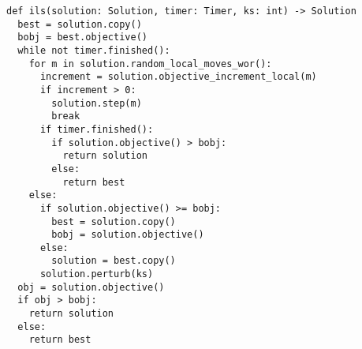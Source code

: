 
\begin{lstlisting}[float=h,caption={Iterated Local Search Solver},label=lst:ils]
def ils(solution: Solution, timer: Timer, ks: int) -> Solution
  best = solution.copy()
  bobj = best.objective()
  while not timer.finished():
    for m in solution.random_local_moves_wor():
      increment = solution.objective_increment_local(m)
      if increment > 0:
        solution.step(m)
        break
      if timer.finished():
        if solution.objective() > bobj:
          return solution
        else:
          return best
    else:
      if solution.objective() >= bobj:
        best = solution.copy()
        bobj = solution.objective() 
      else:
        solution = best.copy()
      solution.perturb(ks)
  obj = solution.objective()
  if obj > bobj:
    return solution
  else:
    return best
\end{lstlisting}